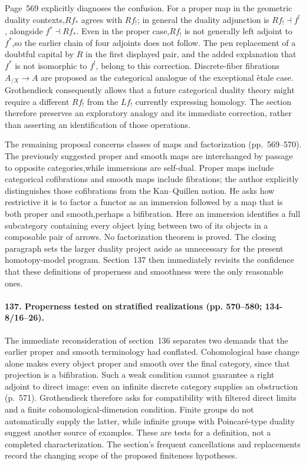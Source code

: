 Page~569 explicitly diagnoses the confusion. For a proper map in the geometric duality contexts,$Rf_*$ agrees with $Rf_!$; in general the duality adjunction is $Rf_!\dashv f^!$, alongside $f^*\dashv Rf_*$. Even in the proper case,$Rf_!$ is not generally left adjoint to $f^*$,so the earlier chain of four adjoints does not follow. The pen replacement of a doubtful capital by $R$ in the first displayed pair, and the added explanation that $f^*$ is not isomorphic to $f^!$, belong to this correction. Discrete-fiber fibrations $A_{/X}\to A$ are proposed as the categorical analogue of the exceptional \`etale case. Grothendieck consequently allows that a future categorical duality theory might require a different $Rf_!$ from the $Lf_!$ currently expressing homology. The section therefore preserves an exploratory analogy and its immediate correction, rather than asserting an identification of those operations.

The remaining proposal concerns classes of maps and factorization (pp.~569--570). The previously suggested proper and smooth maps are interchanged by passage to opposite categories,while immersions are self-dual. Proper maps include categorical cofibrations and smooth maps include fibrations; the author explicitly distinguishes those cofibrations from the Kan--Quillen notion. He asks how restrictive it is to factor a functor as an immersion followed by a map that is both proper and smooth,perhaps a bifibration. Here an immersion identifies a full subcategory containing every object lying between two of its objects in a composable pair of arrows. No factorization theorem is proved. The closing paragraph sets the larger duality project aside as unnecessary for the present homotopy-model program. Section~137 then immediately revisits the confidence that these definitions of properness and smoothness were the only reasonable ones.
\paragraph{137. Properness tested on stratified realizations (pp. 570--580; 134-8/16--26).}
The immediate reconsideration of section~136 separates two demands that the earlier proper and smooth terminology had conflated. Cohomological base change alone makes every object proper and smooth over the final category, since that projection is a bifibration. Such a weak condition cannot guarantee a right adjoint to direct image: even an infinite discrete category supplies an obstruction (p.~571). Grothendieck therefore asks for compatibility with filtered direct limits and a finite cohomological-dimension condition. Finite groups do not automatically supply the latter, while infinite groups with Poincar\'e-type duality suggest another source of examples. These are tests for a definition, not a completed characterization. The section's frequent cancellations and replacements record the changing scope of the proposed finiteness hypotheses.

